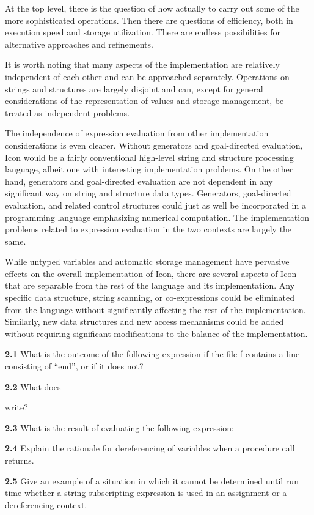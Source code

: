 At the top level, there is the question of how actually to carry out
some of the more sophisticated operations. Then there are questions of
efficiency, both in execution speed and storage utilization. There are
endless possibilities for alternative approaches and refinements.

It is worth noting that many aspects of the implementation are
relatively independent of each other and can be approached
separately. Operations on strings and structures are largely disjoint
and can, except for general considerations of the representation of
values and storage management, be treated as independent problems.

The independence of expression evaluation from other implementation
considerations is even clearer. Without generators and goal-directed
evaluation, Icon would be a fairly conventional high-level string and
structure processing language, albeit one with interesting
implementation problems. On the other hand, generators and
goal-directed evaluation are not dependent in any significant way on
string and structure data types. Generators, goal-directed evaluation,
and related control structures could just as well be incorporated in a
programming language emphasizing numerical computation. The
implementation problems related to expression evaluation in the two
contexts are largely the same.

While untyped variables and automatic storage management have
pervasive effects on the overall implementation of Icon, there are
several aspects of Icon that are separable from the rest of the
language and its implementation. Any specific data structure, string
scanning, or co-expressions could be eliminated from the language
without significantly affecting the rest of the
implementation. Similarly, new data structures and new access
mechanisms could be added without requiring significant modifications
to the balance of the implementation.

\bigskip


\noindent \textbf{2.1} What is the outcome of the following expression if the
file f contains a line consisting of ``end'', or if it does not?


\noindent \textbf{2.2} What does


\noindent write?

\noindent
\textbf{2.3} What is the result of evaluating the following expression:


\noindent \textbf{2.4} Explain the rationale for dereferencing of
variables when a procedure call returns.

\noindent \textbf{2.5} Give an example of a situation in which it
cannot be determined until run time whether a string subscripting
expression is used in an assignment or a dereferencing context.
